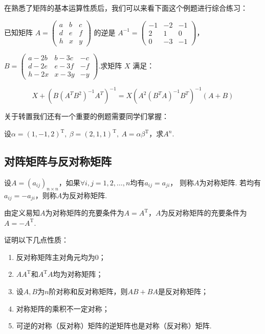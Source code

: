在熟悉了矩阵的基本运算性质后，我们可以来看下面这个例题进行综合练习：
\begin{example}
    已知矩阵 $A=\begin{pmatrix}a & b & c \\ d & e & f \\ h & x & y\end{pmatrix}$ 的逆是 $A^{-1}=\begin{pmatrix}-1 & -2 & -1 \\ 2 & 1 & 0 \\ 0 & -3 & -1\end{pmatrix}$，

$B=\begin{pmatrix}a-2b & b-3c & -c \\ d-2e & e-3f & -f \\ h-2x & x-3y & -y\end{pmatrix}$.求矩阵 $X$ 满足：

\[X+\left(B(A^TB^2)^{-1}A^T\right)^{-1}=X\left(A^2(B^TA)^{-1}B^T\right)^{-1}(A+B)\]
\end{example}
\begin{solution}

\end{solution}

关于转置我们还有一个重要的例题需要同学们掌握：
\begin{example}\label{ex:9:转置求幂}
    设$\alpha=(1,-1,2)^\mathrm{T},\ \beta=(2,1,1)^\mathrm{T},\ A=\alpha\beta^\mathrm{T}$，求$A^n$.
\end{example}

\subsection{对阵矩阵与反对称矩阵}
\begin{definition}
    设$A=(a_{ij})_{n \times n}$，如果$\forall i,j=1,2,\ldots,n$均有$a_{ij}=a_{ji}$，
    则称$A$为对称矩阵. 若均有$a_{ij}=-a_{ji}$，则称$A$为反对称矩阵.
\end{definition}
由定义易知$A$为对称矩阵的充要条件为$A=A^\mathrm{T}$，$A$为反对称矩阵的充要条件为$A=-A^\mathrm{T}$.
\begin{example}
    证明以下几点性质：
    \begin{enumerate}
        \item 反对称矩阵主对角元均为0；

        \item $AA^\mathrm{T}$和$A^\mathrm{T}A$均为对称矩阵；

        \item 设$A,B$为$n$阶对称和反对称矩阵，则$AB+BA$是反对称矩阵；

        \item 对称矩阵的乘积不一定对称；

        \item 可逆的对称（反对称）矩阵的逆矩阵也是对称（反对称）矩阵.
    \end{enumerate}
\end{example}
\begin{solution}

\end{solution}

